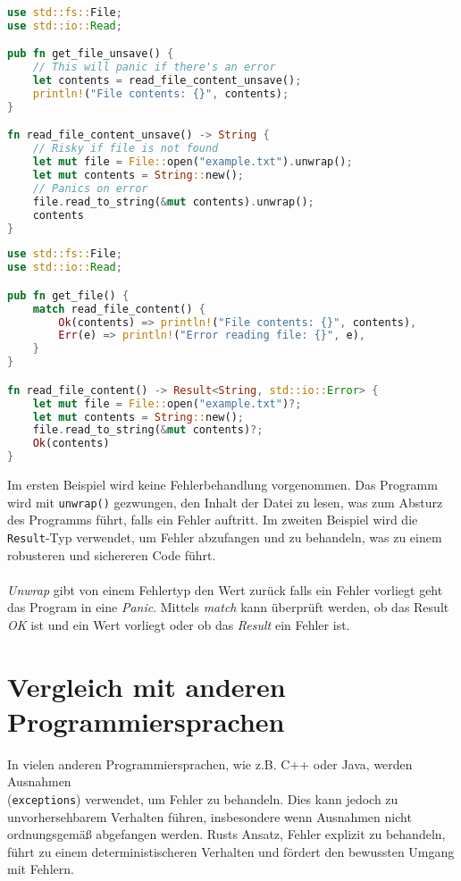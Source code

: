 \begin{lstlisting}[language=Rust, caption=Unsichere Fehlerbehandlung]
use std::fs::File;
use std::io::Read;

pub fn get_file_unsave() {
    // This will panic if there's an error
    let contents = read_file_content_unsave(); 
    println!("File contents: {}", contents);
}

fn read_file_content_unsave() -> String {
    // Risky if file is not found
    let mut file = File::open("example.txt").unwrap();  
    let mut contents = String::new();
    // Panics on error
    file.read_to_string(&mut contents).unwrap();  
    contents
}
\end{lstlisting}
\cleardoublepage
\begin{lstlisting}[language=Rust, caption=Sichere Fehlerbehandlung]
use std::fs::File;
use std::io::Read;

pub fn get_file() {
    match read_file_content() {
        Ok(contents) => println!("File contents: {}", contents),
        Err(e) => println!("Error reading file: {}", e),
    }
}

fn read_file_content() -> Result<String, std::io::Error> {
    let mut file = File::open("example.txt")?;
    let mut contents = String::new();
    file.read_to_string(&mut contents)?;
    Ok(contents)
}
\end{lstlisting}
\noindent
Im ersten Beispiel wird keine Fehlerbehandlung vorgenommen. 
Das Programm wird mit \texttt{unwrap()} gezwungen, den Inhalt der Datei zu lesen, was zum Absturz des Programms führt, falls ein Fehler auftritt. Im zweiten Beispiel wird die \texttt{Result}-Typ verwendet, um Fehler abzufangen und zu behandeln, was zu einem robusteren und sichereren Code führt.\\
\\
\textit{Unwrap} gibt von einem Fehlertyp den Wert zurück falls ein Fehler vorliegt geht das Program in eine \textit{Panic}. 
Mittels \textit{match} kann überprüft werden, ob das Result \textit{OK} ist und ein Wert vorliegt oder ob das \textit{Result} ein Fehler ist.

\section{Vergleich mit anderen Programmiersprachen}
In vielen anderen Programmiersprachen, wie z.B. C++ oder Java, werden Ausnahmen \\ (\texttt{exceptions}) verwendet, um Fehler zu behandeln. 
Dies kann jedoch zu unvorhersehbarem Verhalten führen, insbesondere wenn Ausnahmen nicht ordnungsgemäß abgefangen werden. Rusts Ansatz, Fehler explizit zu behandeln, führt zu einem deterministischeren Verhalten und fördert den bewussten Umgang mit Fehlern.

